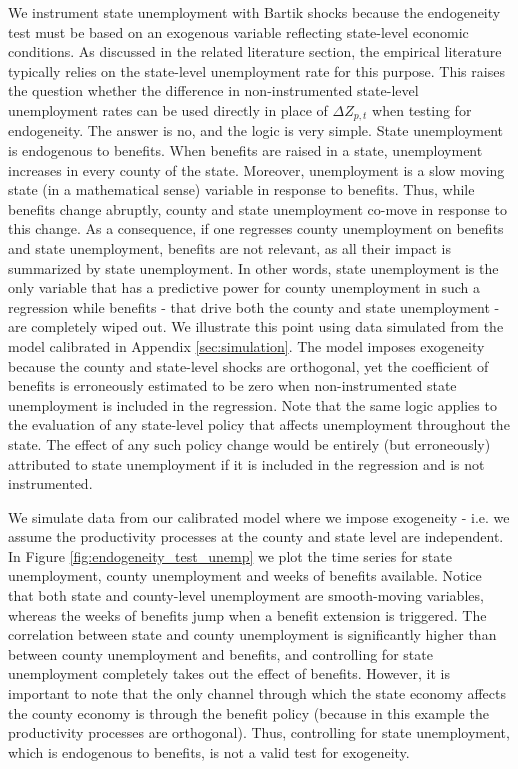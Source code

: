 \documentclass[12pt]{article}
\newcommand{\1}{\mathbf{1}}
\begin{document}
\begin{appendix}
We instrument state unemployment with Bartik shocks because the endogeneity test must be based on an exogenous variable reflecting state-level economic conditions. As discussed in the related literature section, the empirical literature typically relies on the state-level unemployment rate for this purpose. This raises the question whether the difference in non-instrumented state-level unemployment rates can be used directly in place of $\Delta Z_{p,t}$ when testing for endogeneity. The answer is no, and the logic is very simple. State unemployment is endogenous to benefits. When benefits are raised in a state, unemployment increases in every county of the state. Moreover, unemployment is a slow moving state (in a mathematical sense) variable in response to benefits. Thus, while benefits change abruptly, county and state unemployment co-move in response to this change. As a consequence, if one regresses county unemployment on benefits and state unemployment, benefits are not relevant, as all their impact is summarized by state unemployment. In other words, state unemployment is the only variable that has a predictive power for county unemployment in such a regression while benefits - that drive both the county and state unemployment - are completely wiped out. We illustrate this point using data simulated from the model calibrated in Appendix \ref{sec:simulation}. The model imposes exogeneity because the county and state-level shocks are orthogonal, yet the coefficient of benefits is erroneously estimated to be zero when non-instrumented state unemployment is included in the regression. Note that the same logic applies to the evaluation of any state-level policy that affects unemployment throughout the state. The effect of any such policy change would be entirely (but erroneously) attributed to state unemployment if it is included in the regression and is not instrumented.

We simulate data from our calibrated model where we impose exogeneity - i.e. we assume the productivity processes at the county and state level are independent.  In Figure \ref{fig:endogeneity_test_unemp} we plot the time series for state unemployment, county unemployment and weeks of benefits available.  Notice that both state and county-level unemployment are smooth-moving variables, whereas the weeks of benefits jump when a benefit extension is triggered.  The correlation between state and county unemployment is significantly higher than between county unemployment and benefits, and controlling for state unemployment completely takes out the effect of benefits.  However, it is important to note that the only channel through which the state economy affects the county economy is through the benefit policy (because in this example the productivity processes are orthogonal). Thus, controlling for state unemployment, which is endogenous to benefits, is not a valid test for exogeneity.


\end{appendix}
\end{document}
